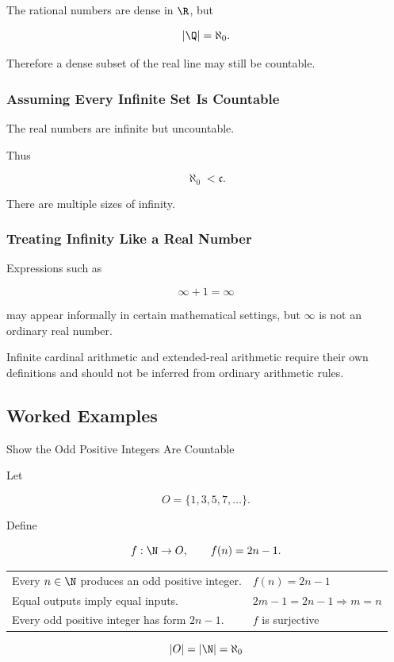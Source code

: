 The rational numbers are dense in \(\R\), but

\[ |\Q|=\aleph_0. \]

Therefore a dense subset of the real line may still be countable.

\subsubsection{Assuming Every Infinite Set Is Countable}
\label{subsec:error-all-infinite-countable}

The real numbers are infinite but uncountable.

Thus

\[ \aleph_0<\mathfrak c. \]

There are multiple sizes of infinity.

\subsubsection{Treating Infinity Like a Real Number}
\label{subsec:error-infinity-real}

Expressions such as

\[ \infty+1=\infty \]

may appear informally in certain mathematical settings, but \(\infty\) is not
an ordinary real number.

Infinite cardinal arithmetic and extended-real arithmetic require their own
definitions and should not be inferred from ordinary arithmetic rules.

\subsection{Worked Examples}
\label{subsec:cardinality-worked-examples}

\begin{workedexamplebox}{Show the Odd Positive Integers Are Countable}

Let

\[ O=\{1,3,5,7,\ldots\}. \]

Define

\[ f:\N\to O,\qquad f(n)=2n-1. \]

\begin{tabularx}{\textwidth}{@{}>{\raggedright\arraybackslash}p{}X@{}}
Every \(n\in\N\) produces an odd positive integer. & \(f(n)=2n-1\)\\
Equal outputs imply equal inputs. & \(2m-1=2n-1\Rightarrow m=n\)\\
Every odd positive integer has form \(2n-1\). & \(f\) is surjective
\end{tabularx}

\begin{answerbox}
\[ |O|=|\N|=\aleph_0 \]
\end{answerbox}
\end{workedexamplebox}

